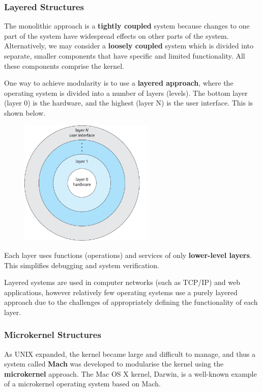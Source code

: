 \documentclass{article}
\begin{document}
\subsubsection{Layered Structures}
The monolithic approach is a \textbf{tightly coupled} system because changes to one part of the system
have widespread effects on other parts of the system. Alternatively, we may consider a
\textbf{loosely coupled} system which is divided into separate, smaller components
that have specific and limited functionality. All these components comprise the kernel.

One way to achieve modularity is to use a \textbf{layered approach},
where the operating system is divided into a number of layers (levels).
The bottom layer (layer 0) is the hardware, and the highest (layer N) is the user interface.
This is shown below.
\begin{figure}[H]
    \centering
    \includegraphics[height = 6cm]{figures/layered_structure.pdf}
\end{figure}
Each layer uses functions (operations) and services of only \textbf{lower-level layers}. This simplifies
debugging and system verification.

Layered systems are used in computer networks (such as TCP/IP) and web applications, however
relatively few operating systems use a purely layered approach due to the challenges of
appropriately defining the functionality of each layer.
\subsubsection{Microkernel Structures}
As UNIX expanded, the kernel became large and difficult to manage, and thus a system called
\textbf{Mach} was developed to modularise the kernel using the \textbf{microkernel} approach.
The Mac OS X kernel, Darwin, is a well-known example of a microkernel operating system based on Mach.
\end{document}
